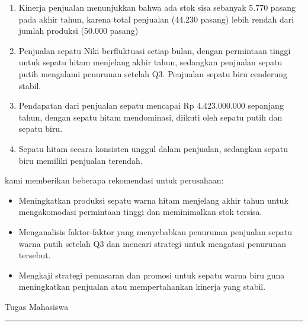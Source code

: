 \documentclass[letterpaper,11pt]{article}
\begin{document}
  \begin{enumerate}
      \item Kinerja penjualan menunjukkan bahwa ada stok sisa sebanyak 5.770 pasang pada akhir tahun, karena total penjualan (44.230 pasang) lebih rendah dari jumlah produksi (50.000 pasang)
      \item Penjualan sepatu Niki berfluktuasi setiap bulan, dengan permintaan tinggi untuk sepatu hitam menjelang akhir tahun, sedangkan penjualan sepatu putih mengalami penurunan setelah Q3. Penjualan sepatu biru cenderung stabil.
      \item Pendapatan dari penjualan sepatu mencapai Rp 4.423.000.000 sepanjang tahun, dengan sepatu hitam mendominasi, diikuti oleh sepatu putih dan sepatu biru.
      \item Sepatu hitam secara konsisten unggul dalam penjualan, sedangkan sepatu biru memiliki penjualan terendah.
  \end{enumerate}
  
  kami memberikan beberapa rekomendasi untuk perusahaan:
  \begin{itemize}
      \item Meningkatkan produksi sepatu warna hitam menjelang akhir tahun untuk mengakomodasi permintaan tinggi dan meminimalkan stok tersisa.
      \item Menganalisis faktor-faktor yang menyebabkan penurunan penjualan sepatu warna putih setelah Q3 dan mencari strategi untuk mengatasi penurunan tersebut.
      \item Mengkaji strategi pemasaran dan promosi untuk sepatu warna biru guna meningkatkan penjualan atau mempertahankan kinerja yang stabil.
  \end{itemize}
  
\newpage
\setcounter{section}{0}

\begin{center}
  \Huge{Tugas Mahasiswa}
\end{center}
\rule{\textwidth}{0.5pt}
\end{document}
